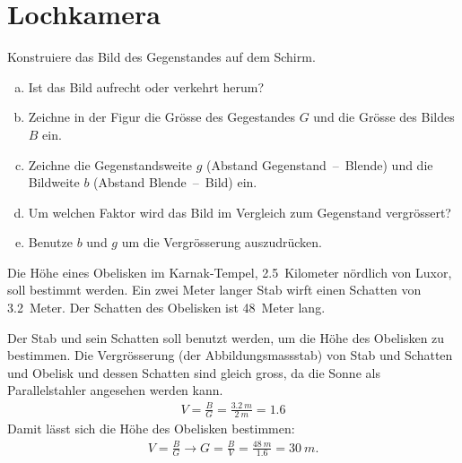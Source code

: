 \documentclass[12pt,a4paper,twoside]{article}
\begin{document}
\section{Lochkamera}
\begin{aufgabe}
	Konstruiere das Bild des Gegenstandes auf dem Schirm.


\begin{enumerate}[a)]
	\item Ist das Bild aufrecht oder verkehrt herum?
	\item Zeichne in der Figur die Grösse des Gegestandes $G$ und die Grösse des Bildes $B$ ein.
	\item Zeichne die Gegenstandsweite $g$ (Abstand Gegenstand\ --\ Blende) und die Bildweite $b$
		(Abstand Blende\ --\ Bild) ein.
	\item Um welchen Faktor wird das Bild im Vergleich zum Gegenstand vergrössert?
	\item Benutze $b$ und $g$ um die Vergrösserung auszudrücken.
\end{enumerate}
\end{aufgabe}

\begin{aufgabe}
	Die Höhe eines Obelisken im Karnak-Tempel, \SI{2,5}{Kilometer} nördlich von Luxor, soll bestimmt werden.
	Ein zwei Meter langer Stab wirft einen Schatten von \SI{3,2}{Meter}. Der Schatten des Obelisken ist \SI{48}{Meter} lang.
	\begin{loesung}
		Der Stab und sein Schatten soll benutzt werden, um die Höhe des Obelisken zu bestimmen. Die Vergrösserung (der Abbildungsmassstab)
		von Stab und Schatten und Obelisk und dessen Schatten sind gleich gross, da die Sonne als Parallelstahler angesehen werden kann.
		\begin{eqnarray*}
			V=\frac{B}{G}=\frac{\SI{3.2}{m}}{\SI{2}{m}} = \num{1.6}
		\end{eqnarray*}
		Damit lässt sich die Höhe des Obelisken bestimmen:
		\begin{eqnarray*}
			V=\frac{B}{G}\to G=\frac{B}{V}=\frac{\SI{48}{m}}{\num{1.6}}=\SI{30}{m}\text{.}
		\end{eqnarray*}
	\end{loesung}
\end{aufgabe}
\end{document}
